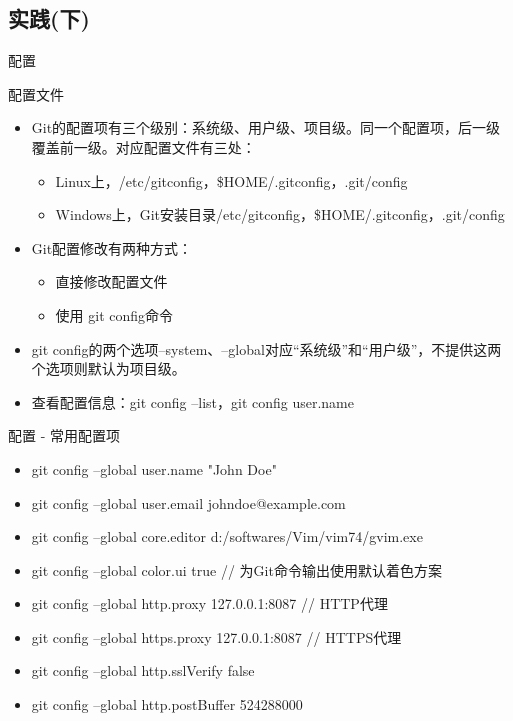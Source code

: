 \documentclass[CJK, 10pt]{beamer}
\begin{document}
\begin{CJK*}{UTF8}{gbsn}
\section{实践(下)}
\begin{frame}{配置}
    \begin{block}{配置文件}
        \begin{itemize}
        \item Git的配置项有三个级别：系统级、用户级、项目级。同一个配置项，后一级覆盖前一级。对应配置文件有三处：
        \begin{itemize}
                \item Linux上，/etc/gitconfig，\$HOME/.gitconfig，.git/config
                \item Windows上，Git安装目录/etc/gitconfig，\$HOME/.gitconfig，.git/config
            \end{itemize}
        \item Git配置修改有两种方式：
        \begin{itemize}
            \item 直接修改配置文件
            \item 使用 git config命令
        \end{itemize}
        \item git config的两个选项--system、--global对应“系统级”和“用户级”，不提供这两个选项则默认为项目级。
        \item 查看配置信息：git config --list，git config user.name
        \end{itemize}
    \end{block}
\end{frame}
\begin{frame}{配置 - 常用配置项}
    \begin{block}{}
        \begin{itemize}
            \item git config --global user.name "John Doe"
            \item git config --global user.email johndoe@example.com
            \item git config --global core.editor d:/softwares/Vim/vim74/gvim.exe
            \item git config --global color.ui true   // 为Git命令输出使用默认着色方案
            \item git config --global http.proxy 127.0.0.1:8087 // HTTP代理
            \item git config --global https.proxy 127.0.0.1:8087 // HTTPS代理
            \item git config --global http.sslVerify false
            \item git config --global http.postBuffer 524288000
        \end{itemize}
    \end{block}
\end{frame}


\end{CJK*}
\end{document}
